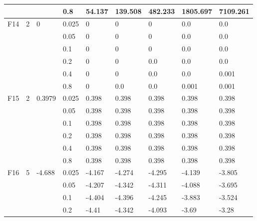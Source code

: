 \begin{longtable}{|l|l|l|l|l|l|l|l|l|}
\cmidrule{4-9} &     &          & 0.8            & 54.137     & 139.508    & 482.233    & 1805.697   & 7109.261   \\ \midrule
F14            & 2   & 0        & 0.025          & 0          & 0          & 0          & 0.0        & 0.0        \\
\cmidrule{4-9} &     &          & 0.05           & 0          & 0          & 0          & 0.0        & 0.0        \\
\cmidrule{4-9} &     &          & 0.1            & 0          & 0          & 0          & 0.0        & 0.0        \\
\cmidrule{4-9} &     &          & 0.2            & 0          & 0          & 0.0        & 0.0        & 0.0        \\
\cmidrule{4-9} &     &          & 0.4            & 0          & 0          & 0.0        & 0.0        & 0.001      \\
\cmidrule{4-9} &     &          & 0.8            & 0          & 0.0        & 0.0        & 0.001      & 0.001      \\ \midrule
F15            & 2   & 0.3979   & 0.025          & 0.398      & 0.398      & 0.398      & 0.398      & 0.398      \\
\cmidrule{4-9} &     &          & 0.05           & 0.398      & 0.398      & 0.398      & 0.398      & 0.398      \\
\cmidrule{4-9} &     &          & 0.1            & 0.398      & 0.398      & 0.398      & 0.398      & 0.398      \\
\cmidrule{4-9} &     &          & 0.2            & 0.398      & 0.398      & 0.398      & 0.398      & 0.398      \\
\cmidrule{4-9} &     &          & 0.4            & 0.398      & 0.398      & 0.398      & 0.398      & 0.398      \\
\cmidrule{4-9} &     &          & 0.8            & 0.398      & 0.398      & 0.398      & 0.398      & 0.398      \\ \midrule
F16            & 5   & -4.688   & 0.025          & -4.167     & -4.274     & -4.295     & -4.139     & -3.805     \\
\cmidrule{4-9} &     &          & 0.05           & -4.207     & -4.342     & -4.311     & -4.088     & -3.695     \\
\cmidrule{4-9} &     &          & 0.1            & -4.404     & -4.396     & -4.245     & -3.883     & -3.524     \\
\cmidrule{4-9} &     &          & 0.2            & -4.41      & -4.342     & -4.093     & -3.69      & -3.28      \\

\end{longtable}
